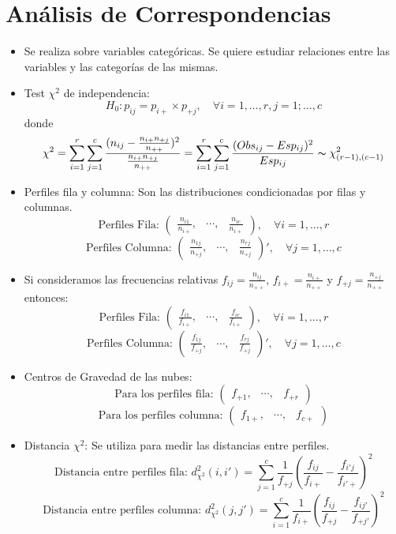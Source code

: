 \section{Análisis de Correspondencias}

\begin{itemize}
    \item Se realiza sobre variables categóricas. Se quiere estudiar relaciones entre las variables y las categorías de las mismas.
    \item Test $\chi^2$ de independencia: \[H_0:p_{ij}=p_{i+}\times p_{+j}, \quad \forall i=1,\dots,r,j=1;\dots,c\] donde \[\chi^2 = \sum_{i=1}^{r}\sum_{j=1}^{c}\frac{(n_{ij}-\frac{n_{i+}n_{+j}}{n_{++}})^2}{\frac{n_{i+}n_{+j}}{n_{++}}}=\sum_{i=1}^{r}\sum_{j=1}^{c}\frac{(Obs_{ij}-Esp_{ij})^2}{Esp_{ij}}\thicksim \chi^2_{(r-1),(c-1)}\]
    \item Perfiles fila y columna: Son las distribuciones condicionadas por filas y columnas. \[\text{Perfiles Fila: }\begin{pmatrix}\frac{n_{i1}}{n_{i+}}, & \cdots, & \frac{n_{ic}}{n_{i+}}\end{pmatrix}, \quad \forall i=1,\dots,r\] \[\text{Perfiles Columna: }\begin{pmatrix}\frac{n_{1j}}{n_{+j}}, & \cdots, & \frac{n_{rj}}{n_{+j}}\end{pmatrix}', \quad \forall j=1,\dots,c\]
    \item Si consideramos las frecuencias relativas $f_{ij}=\frac{n_{ij}}{n_{++}}$, $f_{i+}=\frac{n_{i+}}{n_{++}}$ y $f_{+j}=\frac{n_{+j}}{n_{++}}$ entonces: \[\text{Perfiles Fila: }\begin{pmatrix}\frac{f_{i1}}{f_{i+}}, & \cdots, & \frac{f_{ic}}{f_{i+}}\end{pmatrix}, \quad \forall i=1,\dots,r\] \[\text{Perfiles Columna: }\begin{pmatrix}\frac{f_{1j}}{f_{+j}}, & \cdots, & \frac{f_{rj}}{f_{+j}}\end{pmatrix}', \quad \forall j=1,\dots,c\]
    \item Centros de Gravedad de las nubes: \[\text{Para los perfiles fila: }\begin{pmatrix}f_{+1}, & \cdots, & f_{+r}\end{pmatrix}\] \[\text{Para los perfiles columna: }\begin{pmatrix}f_{1+}, & \cdots, & f_{c+}\end{pmatrix}\]
    \item Distancia $\chi^2$: Se utiliza para medir las distancias entre perfiles. \[\text{Distancia entre perfiles fila: }d^2_{\chi^2}(i,i')=\sum_{j=1}^{c}\frac{1}{f_{+j}}(\frac{f_{ij}}{f_{i+}}-\frac{f_{i'j}}{f_{i'+}})^2\] \[\text{Distancia entre perfiles columna: }d^2_{\chi^2}(j,j')=\sum_{i=1}^{c}\frac{1}{f_{i+}}(\frac{f_{ij}}{f_{+j}}-\frac{f_{ij'}}{f_{+j'}})^2\]

\end{itemize}
